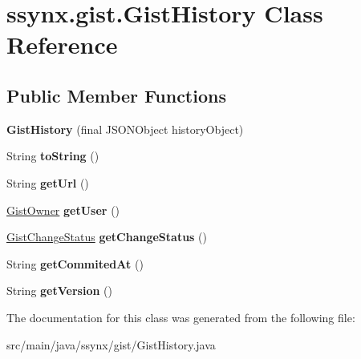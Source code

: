 \hypertarget{classssynx_1_1gist_1_1GistHistory}{}\section{ssynx.\+gist.\+Gist\+History Class Reference}
\label{classssynx_1_1gist_1_1GistHistory}
\subsection*{Public Member Functions}
\begin{DoxyCompactItemize}
\item 
\mbox{\label{classssynx_1_1gist_1_1GistHistory_a98a4bd6bdc1576ffe24fe72c85be653d}} 
{\bfseries Gist\+History} (final J\+S\+O\+N\+Object history\+Object)
\item 
\mbox{\label{classssynx_1_1gist_1_1GistHistory_a08b8abac3f7fa1c55eb221eeb0a8a727}} 
String {\bfseries to\+String} ()
\item 
\mbox{\label{classssynx_1_1gist_1_1GistHistory_a5c8fcb6a1c661715139752f0aff00af8}} 
String {\bfseries get\+Url} ()
\item 
\mbox{\label{classssynx_1_1gist_1_1GistHistory_aedec17ad7a425592c09536a292db43a2}} 
\hyperlink{classssynx_1_1gist_1_1GistOwner}{Gist\+Owner} {\bfseries get\+User} ()
\item 
\mbox{\label{classssynx_1_1gist_1_1GistHistory_a041cc83451ed21c772bed91f49102515}} 
\hyperlink{classssynx_1_1gist_1_1GistChangeStatus}{Gist\+Change\+Status} {\bfseries get\+Change\+Status} ()
\item 
\mbox{\label{classssynx_1_1gist_1_1GistHistory_ad632a382fb05137c220d68aa115a1b2c}} 
String {\bfseries get\+Commited\+At} ()
\item 
\mbox{\label{classssynx_1_1gist_1_1GistHistory_a1f3edfbbe4ac516dcdd818c7f4aa6d28}} 
String {\bfseries get\+Version} ()
\end{DoxyCompactItemize}


The documentation for this class was generated from the following file\+:\begin{DoxyCompactItemize}
\item 
src/main/java/ssynx/gist/Gist\+History.\+java\end{DoxyCompactItemize}
